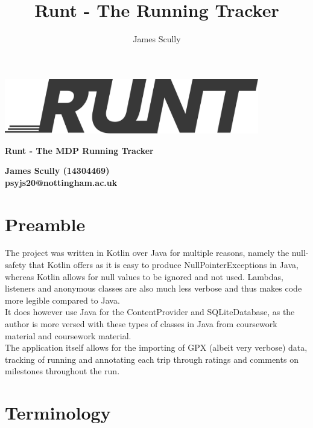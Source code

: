 \documentclass[11pt]{article}
\title{\textbf{Runt - The Running Tracker}}
\author{James Scully}
\begin{document}
\hspace{0pt}

\vfill

\begin{center}
	\includegraphics[width=30em]{runtlogo_dark}
	
	\vspace{1cm}	
	{\Large \textbf{Runt - The MDP Running Tracker}} \linebreak
	
	\begin{large}
		\textbf{James Scully (14304469) \\
		psyjs20@nottingham.ac.uk \\}
	\end{large}
	
\end{center}

\vfill

\pagebreak

\tableofcontents

\newpage

\section{Preamble}
The project was written in Kotlin over Java for multiple reasons, namely the null-safety that Kotlin offers as it is easy to produce NullPointerExceptions in Java, whereas Kotlin allows for null values to be ignored and not used. Lambdas, listeners and anonymous classes are also much less verbose and thus makes code more legible compared to Java. \\

It does however use Java for the ContentProvider and SQLiteDatabase, as the author is more versed with these types of classes in Java from coursework material and coursework material.\\

The application itself allows for the importing of GPX (albeit very verbose) data, tracking of running and annotating each trip through ratings and comments on milestones throughout the run.

\section{Terminology}
\end{document}
